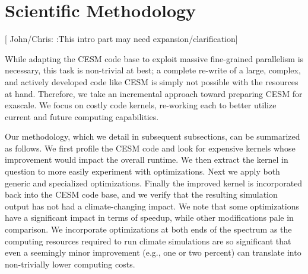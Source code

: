 


\section{Scientific Methodology}\label{sec:method}

[{\color{red} John/Chris: }:This intro part may need expansion/clarification]

While adapting the CESM code base to exploit massive fine-grained parallelism is necessary, this task is non-trivial at best; a complete re-write of a large, complex, and actively developed code like CESM is simply not possible with the resources at hand.  Therefore, we take an incremental approach toward preparing CESM for exascale. We focus on costly code kernels, re-working each to better utilize current and future computing capabilities.   

Our methodology, which we detail in subsequent subsections, can be summarized as follows.  We first profile the CESM code and look for expensive kernels whose improvement would impact the overall runtime.  We then extract the kernel in question to more easily experiment with optimizations. Next we apply both generic and specialized optimizations. Finally the improved kernel is incorporated back into the CESM code base, and we verify that the resulting simulation output has not had a climate-changing impact.  We note that some optimizations have a significant impact in terms of speedup, while other modifications pale in comparison. We incorporate optimizations at both ends of the spectrum as the computing resources required to run climate simulations are so significant that even a seemingly minor improvement (e.g., one or two percent) can translate into non-trivially lower computing costs.

